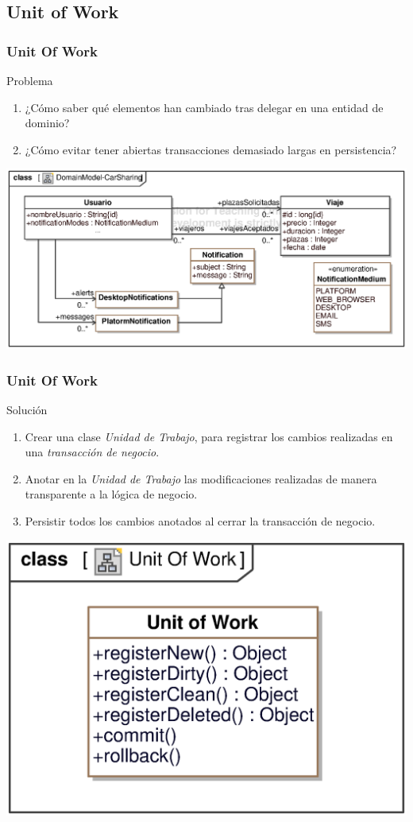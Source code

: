 \documentclass[handout,a4paper,slidestop,xcolor=pst,blue]{beamer}
\begin{document}
\subsection{Unit of Work}

\begin{frame}[c]
    \frametitle{Unit Of Work}
    \begin{block}{Problema}
        \begin{enumerate}
            \item<1-> ¿Cómo saber qué elementos han cambiado tras delegar en una entidad de dominio?
            \item<2-> ¿Cómo evitar tener abiertas transacciones demasiado largas en persistencia?
        \end{enumerate}
    \end{block}
    \begin{center}
        \includegraphics[width=0.8\linewidth]{images/patterns/unitOfWork00.eps}
    \end{center}
\end{frame}

\begin{frame}[c]
    \frametitle{Unit Of Work}
    \begin{block}{Solución}
        \begin{enumerate}
            \item<1-> Crear una clase \emph{Unidad de Trabajo}, para registrar los cambios realizadas en una \emph{transacción de negocio}.
            \item<2-> Anotar en la \emph{Unidad de Trabajo} las modificaciones realizadas de manera transparente a la lógica de negocio.
            \item<3-> Persistir todos los cambios anotados al cerrar la transacción de negocio.
        \end{enumerate}
    \end{block}
    \begin{center}
        \includegraphics[width=0.40\linewidth]{images/patterns/unitOfWork01.eps}
    \end{center}
\end{frame}
\end{document}

